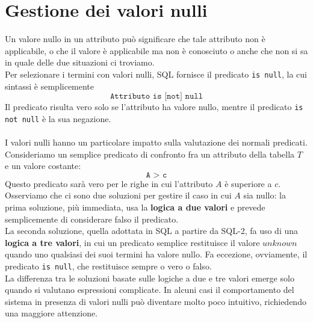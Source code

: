 \section{Gestione dei valori nulli}
Un valore nullo in un attributo può significare che tale attributo non è applicabile, o che il valore è applicabile ma non è conosciuto o anche che non si sa in quale delle due situazioni ci troviamo.\\
Per selezionare i termini con valori nulli, SQL fornisce il predicato \texttt{is null}, la cui sintassi è semplicemente
    $$\texttt{Attributo is [not] null}$$
Il predicato risulta vero solo se l'attributo ha valore nullo, mentre il predicato \texttt{is not null} è la sua negazione.\\\\
I valori nulli hanno un particolare impatto sulla valutazione dei normali predicati.\\
Consideriamo un semplice predicato di confronto fra un attributo della tabella $T$ e un valore costante:
    $$\texttt{A > c}$$
Questo predicato sarà vero per le righe in cui l'attributo $A$ è superiore a $c$.\\
Osserviamo che ci sono due soluzioni per gestire il caso in cui $A$ sia nullo: la prima soluzione, più immediata, usa la \textbf{logica a due valori} e prevede semplicemente di considerare falso il predicato.\\
La seconda soluzione, quella adottata in SQL a partire da SQL-2, fa uso di una \textbf{logica a tre valori}, in cui un predicato semplice restituisce il valore $unknown$ quando uno qualsiasi dei suoi termini ha valore nullo. Fa eccezione, ovviamente, il predicato \texttt{is null}, che restituisce sempre o vero o falso.\\
La differenza tra le soluzioni basate sulle logiche a due e tre valori emerge solo quando si valutano espressioni complicate. In alcuni casi il comportamento del sistema in presenza di valori nulli può diventare molto poco intuitivo, richiedendo una maggiore attenzione.




